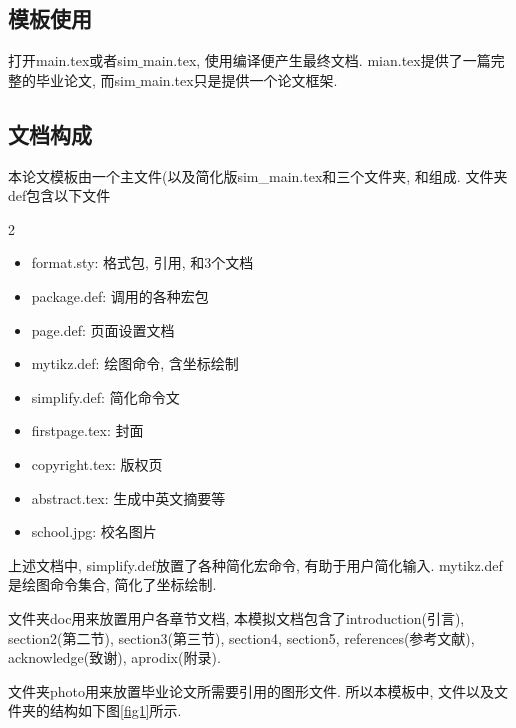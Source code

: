\documentclass[a4paper,12pt,twoside]{ctexart}
\begin{document}
\subsection{模板使用}
    打开main.tex或者sim$\_$main.tex, 使用编译便产生最终文档. mian.tex提供了一篇完整的毕业论文, 而sim$\_$main.tex只是提供一个论文框架.

\subsection{文档构成}
    本论文模板由一个主文件(以及简化版sim\_main.tex和三个文件夹, 和组成. 文件夹def包含以下文件
    \begin{multicols}{2}
    \begin{itemize}
      \item[1)] format.sty: 格式包, 引用,  和3个文档
      \item[2)] package.def: 调用的各种宏包
      \item[3)] page.def: 页面设置文档
      \item[4)] mytikz.def: 绘图命令, 含坐标绘制
      \item[5)] simplify.def: 简化命令文
      \item[6)] firstpage.tex: 封面
      \item[7)] copyright.tex: 版权页
      \item[8)] abstract.tex: 生成中英文摘要等
      \item[9)] school.jpg: 校名图片
    \end{itemize}
    \end{multicols}\noindent
    上述文档中, simplify.def放置了各种简化宏命令, 有助于用户简化输入. mytikz.def是绘图命令集合, 简化了坐标绘制.

    文件夹doc用来放置用户各章节文档, 本模拟文档包含了introduction(引言), section2(第二节), section3(第三节), section4, section5, references(参考文献), acknowledge(致谢), aprodix(附录).

    文件夹photo用来放置毕业论文所需要引用的图形文件. 所以本模板中, 文件以及文件夹的结构如下图\ref{fig1}所示.
\end{document}
